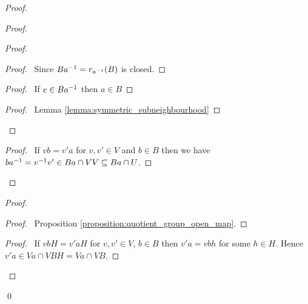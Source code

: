 \begin{proof}
    \pf
    \begin{proof}
        \begin{proof}
            \begin{proof}
                \pf\ Since $B {a}^{-1} = r_{{a}^{-1}}(B)$ is closed.
            \end{proof}
            \begin{proof}
                \pf\ If $e \in B {a}^{-1}$ then $a \in B$
            \end{proof}
            \qedstep
            \begin{proof}
                \pf\ Lemma \ref{lemma:symmetric_subneighbourhood}
            \end{proof}
        \end{proof}
        \begin{proof}
            \pf\ If $vb = v'a$ for $v, v' \in V$ and $b \in B$ then we have $b{a}^{-1} = {v}^{-1}v' \in Ba \cap VV \subseteq Ba \cap U$.
        \end{proof}
    \end{proof}
    \begin{proof}
        \begin{proof}
            \pf\ Proposition \ref{proposition:quotient_group_open_map}.
        \end{proof}
        \begin{proof}
            \pf\ If $vbH = v'aH$ for $v,v' \in V$, $b \in B$ then $v'a = vbh$ for some $h \in H$. Hence $v'a \in Va \cap VBH = Va \cap VB$.
        \end{proof}
    \end{proof}
    \qed
\end{proof}


